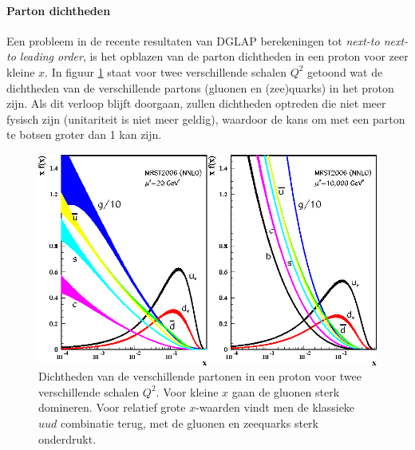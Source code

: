 \documentclass[a4paper,11pt]{article}
\numberwithin{equation}{section} %
\begin{document}
      \paragraph{Parton dichtheden}
Een probleem in de recente resultaten van DGLAP berekeningen tot \textit{next-to next-to leading order}, is het opblazen van de parton dichtheden in een proton voor zeer kleine $x$.
In figuur \ref{fig:PD} staat voor twee verschillende schalen $Q^2$ getoond wat de dichtheden van de verschillende partons (gluonen en (zee)quarks) in het proton zijn.
Als dit verloop blijft doorgaan, zullen dichtheden optreden die niet meer fysisch zijn (unitariteit is niet meer geldig), waardoor de kans om met een parton te botsen groter dan 1 kan zijn.
\begin{figure} [H]
  \begin{center}
    \includegraphics[scale=1]{Afbeeldingen/PD.eps}
    \caption{Dichtheden van de verschillende partonen in een proton voor twee verschillende schalen $Q^2$. Voor kleine $x$ gaan de gluonen sterk domineren. Voor relatief grote $x$-waarden vindt men de klassieke $uud$ combinatie terug, met de gluonen en zeequarks sterk onderdrukt. \cite{Martin}}
   \label{fig:PD}
  \end{center}
\end{figure}
\end{document}
